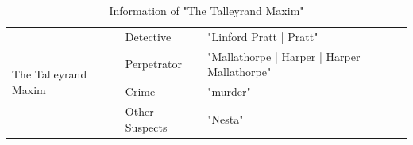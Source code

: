 \documentclass{article}
\begin{document}
\begin{table}[htbp]
\centering
\caption{Information of "The Talleyrand Maxim"}
\begin{tabular}{@{}l|l|l@{}}
\toprule
\multirow{6}{*}{The Talleyrand Maxim} & Detective      & "Linford Pratt | Pratt"                                                                                                                                                                                                                                                                                                                                                                                                                                                                                                  \\ \cmidrule(l){2-3} 
                                      & Perpetrator    & "Mallathorpe | Harper | Harper Mallathorpe"                                                                                                                                                                                                                                                                                                                                                                                                                                                                                \\ \cmidrule(l){2-3} 
                                      & Crime          & "murder"                                                                                                                                                                                                                                                                                                                                                                                                                                                                                                               \\ \cmidrule(l){2-3} 
                                      & Other Suspects & "Nesta"                                                                                                                                                                                                                                                                                                                                                                                                                                                                                                                \\ \cmidrule(l){2-3} 

\end{tabular}
\end{table}
\end{document}
